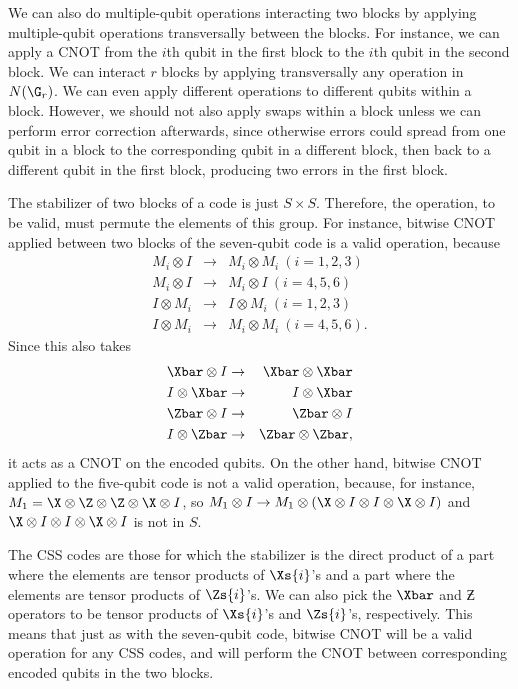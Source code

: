 We can also do multiple-qubit operations interacting two blocks by
applying multiple-qubit operations transversally between the blocks.  For
instance, we can apply a CNOT from the $i$th qubit in the first block to the
$i$th qubit in the second block.  We can interact $r$ blocks by applying
transversally any operation in $N(\G_r)$.  We can even apply different
operations to different qubits within a block.  However, we should not also
apply swaps within a block unless we can perform error correction
afterwards, since otherwise errors could spread from one qubit in a block
to the corresponding qubit in a different block, then back to a different
qubit in the first block, producing two errors in the first block.

The stabilizer of two blocks of a code is just $S \times S$.  Therefore, the
operation, to be valid, must permute the elements of this group.  For
instance, bitwise CNOT applied between two blocks of the seven-qubit code
is a valid operation, because
\begin{eqnarray}
	M_i \otimes I & \rightarrow & M_i \otimes M_i \ (i = 1, 2, 3) \nonumber \\
	M_i \otimes I & \rightarrow & M_i \otimes I \ (i = 4, 5, 6) \\
	I \otimes M_i & \rightarrow & I \otimes M_i \ (i = 1, 2, 3) \nonumber \\
	I \otimes M_i & \rightarrow & M_i \otimes M_i \ (i = 4, 5, 6). \nonumber
\end{eqnarray}
Since this also takes
\begin{eqnarray}
	\Xbar \otimes I & \rightarrow & \Xbar \otimes \Xbar \nonumber \\
	I \otimes \Xbar & \rightarrow & I \otimes \Xbar \\
	\Zbar \otimes I & \rightarrow & \Zbar \otimes I \nonumber \\
	I \otimes \Zbar & \rightarrow & \Zbar \otimes \Zbar, \nonumber
\end{eqnarray}
it acts as a CNOT on the encoded qubits.  On the other hand, bitwise CNOT
applied to the five-qubit code is not a valid operation, because, for instance,
$M_1 = \X \otimes \Z \otimes \Z \otimes \X \otimes I$, so $M_1 \otimes I
\rightarrow M_1 \otimes (\X \otimes I \otimes I \otimes \X \otimes I)$
and $\X \otimes I \otimes I \otimes \X \otimes I$ is not in $S$.

The CSS codes are those for which the stabilizer is the direct product of a
part where the elements are tensor products of $\Xs{i}$'s and a part where
the elements are tensor products of $\Zs{i}$'s.  We can also pick the $\Xbar$
and $\Zbar$ operators to be tensor products of $\Xs{i}$'s and $\Zs{i}$'s,
respectively.  This means that just as with the seven-qubit code, bitwise CNOT
will be a valid operation for any CSS codes, and will perform the CNOT between
corresponding encoded qubits in the two blocks.

